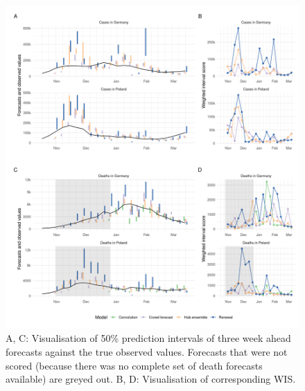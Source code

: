 \documentclass[
]{article}
\begin{document}
\begin{figure}[H]
\includegraphics[width=1\linewidth,]{../analysis/plots/figure-forecasts-3} \caption{A, C: Visualisation of 50\% prediction intervals of three week ahead forecasts against the true observed values. Forecasts that were not scored (because there was no complete set of death forecasts available) are greyed out. B, D: Visualisation of corresponding WIS.}\label{fig:forecasts-and-truth-3}
\end{figure}
\end{document}
